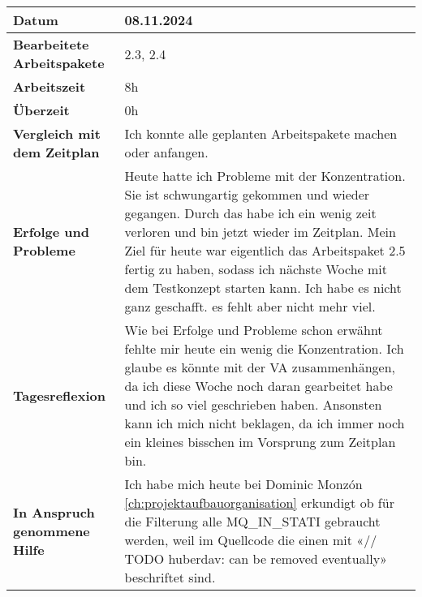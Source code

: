 \begin{longtable}{p{}|p{}}
	\hline
	\textbf{Datum}                       & 08.11.2024            \\
	\hline
	\textbf{Bearbeitete Arbeitspakete}   & 2.3, 2.4                  \\
	\hline
	\textbf{Arbeitszeit}                 & 8h                                    \\
	\hline
	\textbf{Überzeit}                    & 0h                                    \\
	\hline
	\textbf{Vergleich mit dem Zeitplan}  & Ich konnte alle geplanten Arbeitspakete machen oder anfangen.  \\
	\hline
	\textbf{Erfolge und Probleme} & Heute hatte ich Probleme mit der Konzentration. Sie ist schwungartig gekommen und wieder gegangen. Durch das habe ich ein wenig zeit verloren und bin jetzt wieder im Zeitplan. Mein Ziel für heute war eigentlich das Arbeitspaket 2.5 fertig zu haben, sodass ich nächste Woche mit dem Testkonzept starten kann. Ich habe es nicht ganz geschafft. es fehlt aber nicht mehr viel.
	\\
	\hline
	\textbf{Tagesreflexion} & Wie bei Erfolge und Probleme schon erwähnt fehlte mir heute ein wenig die Konzentration. Ich glaube es könnte mit der VA zusammenhängen, da ich diese Woche noch daran gearbeitet habe und ich so viel geschrieben haben. Ansonsten kann ich mich nicht beklagen, da ich immer noch ein kleines bisschen im Vorsprung zum Zeitplan bin.
	\\
	\hline
	\textbf{In Anspruch genommene Hilfe} & Ich habe mich heute bei Dominic Monzón \ref{ch:projektaufbauorganisation} erkundigt ob für die Filterung alle MQ\_IN\_STATI gebraucht werden, weil im Quellcode die einen mit «// TODO huberdav: can be removed eventually» beschriftet sind.                               \\
	\hline
\end{longtable}\label{tab:arbeitsprotokoll-08.11.2024}
\newpage

